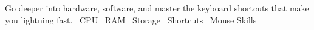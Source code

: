 
  {Go deeper into hardware, software, and master the keyboard shortcuts that make you lightning fast.}
  {\faMicrochip\ CPU \quad \faMemory\ RAM \quad \faHdd\ Storage \quad \faKeyboard\ Shortcuts \quad \faMouse\ Mouse Skills}
